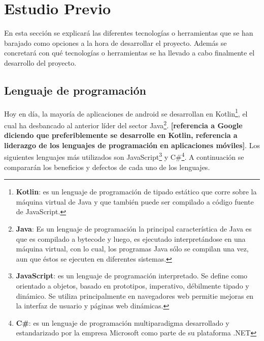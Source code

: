 \documentclass{report}
\begin{document}
\chapter{Estudio Previo}
En esta sección se explicará las diferentes tecnologías o herramientas que se han barajado como opciones a la hora de desarrollar el proyecto. Además se concretará con qué tecnologías o herramientas se ha llevado a cabo finalmente el desarrollo del proyecto.
\section{Lenguaje de programación}
Hoy en día, la mayoría de aplicaciones de android se desarrollan en Kotlin\footnote{\textbf{Kotlin}: es un lenguaje de programación de tipado estático que corre sobre la máquina virtual de Java y que también puede ser compilado a código fuente de JavaScript.}, el cual ha desbancado al anterior líder del sector Java\footnote{\textbf{Java}: Es un lenguaje de programación la principal característica de Java es que es compilado a bytecode y luego, es ejecutado interpretándose en una máquina virtual, con lo cual, los programas Java sólo se compilan una vez, aun que éstos se ejecuten en diferentes sistemas.}. \textbf{[referencia a Google diciendo que preferiblemente se desarrolle en Kotlin, referencia a liderazgo de los lenguajes de programación en aplicaciones móviles]}. Los siguientes lenguajes más utilizados son JavaScript\footnote{\textbf{JavaScript}: es un lenguaje de programación interpretado. Se define como orientado a objetos, basado en prototipos, imperativo, débilmente tipado y dinámico. Se utiliza principalmente en navegadores web permitie mejoras en la interfaz de usuario y páginas web dinámicas.} y C\#\footnote{\textbf{C\#}: es un lenguaje de programación multiparadigma desarrollado y estandarizado por la empresa Microsoft como parte de su plataforma .NET}. A continuación se compararán los beneficios y defectos de cada uno de los lenguajes.
\end{document}

